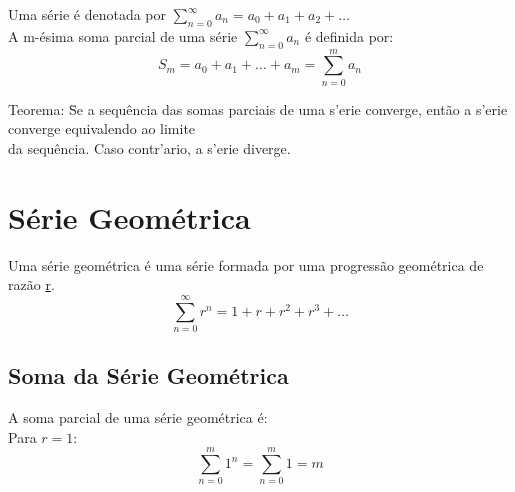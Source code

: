 \documentclass{article}
\begin{document}
Uma s\'erie \'e denotada por $\sum\limits_{n=0}^\infty a_n = a_0 + a_1 + a_2 + \hdots$ \\
A m-\'esima soma parcial de uma s\'erie $\sum\limits_{n=0}^\infty a_n$ \'e definida por:
\[ S_m = a_0 + a_1 + \hdots + a_m = \sum\limits_{n=0}^m a_n \]
\begin{tabbing}
  Teorema: \=Se a sequ\^encia das somas parciais de uma s\a'erie converge, ent\~ao a s\a'erie converge equivalendo ao limite \\
  \> da sequ\^encia. Caso contr\a'ario, a s\a'erie diverge.
\end{tabbing}



\newpage
\section{S\'erie Geom\'etrica}

Uma s\'erie geom\'etrica \'e uma s\'erie formada por uma progress\~ao geom\'etrica de raz\~ao \underline{r}.
\[ \sum_{n=0}^\infty r^n = 1 + r + r^2 + r^3 + \hdots \]
\subsection{Soma da S\'erie Geom\'etrica}
A soma parcial de uma s\'erie geom\'etrica \'e: \\

Para $r = 1$:
\[ \sum_{n=0}^m 1^n = \sum_{n=0}^m 1 = m \]
\end{document}
